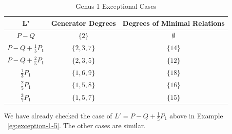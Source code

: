 \documentclass{amsart}
\theoremstyle{plain}
\theoremstyle{definition}
\theoremstyle{remark}
\newtheorem{rem}[thm]{Remark}
\numberwithin{equation}{section}
\begin{document}
\begin{longtable}	{| c || c | c |}
	\caption{Genus 1 Exceptional Cases}
	\label{table:g-1-exceptional}
	
	\tabularnewline
	
	\hline
	L' & Generator Degrees & Degrees of Minimal Relations \\
	\hline
	\hline
	$P - Q$ & $\{2\}$ & $\emptyset$ \\	\hline

	$P - Q + \frac{1}{3}P_1$ & $\{2,3,7\}$ & $\{14\}$ \\	\hline

	$P - Q + \frac{2}{5}P_1$ & $\{2,3,5\}$ & $\{12\}$ \\	\hline
	
	$\frac{1}{3}P_1$ & $\{1,6,9\}$ & $\{18\}$ \\	\hline

	$\frac{2}{5}P_1$ & $\{1,5,8\}$ & $\{16\}$ \\	\hline
	
	$\frac{3}{7}P_1$ & $\{1,5,7\}$ & $\{15\}$ \\	\hline
	
	
\end{longtable}


We have already checked the case of 
$L' = P - Q + \frac{1}{5}P_1$ above in Example ~\ref{eg:exception-1-5}. The other cases are similar.
\end{document}
